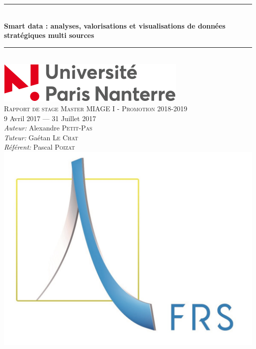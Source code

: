 \documentclass[12pt,french,a4paper, oneside,openright]{report}
\newcommand{\HRule}{\rule{\linewidth}{0.5mm}}
\begin{document}
\begin{titlepage}
  \begin{sffamily}
  \begin{center}

    \HRule \\[0.4cm]
    {
      \huge
        \textbf{Smart data : analyses, valorisations et visualisations de données stratégiques multi sources}
    }
    \HRule \\[1.5cm]
    {\includegraphics[scale=0.6, draft=false]{./resources/upn.jpg}}
    \\[1.5cm]
    \textsc{\Large Rapport de stage \linebreak Master MIAGE I - Promotion 2018-2019}\\[1.5cm]
    
    \large 9 Avril 2017 — 31 Juillet 2017
    \\[1.5cm]
	\emph{Auteur:} Alexandre \textsc{Petit-Pas}\\
	\emph{Tuteur:} Gaétan \textsc{Le Chat}\\
  	\emph{Référent:} Pascal \textsc{Poizat}\\[1cm]
	{\includegraphics[scale=0.5, draft=false]{./resources/frs.jpg}}
    
    

  \end{center}
  \end{sffamily}
\end{titlepage}
\end{document}
